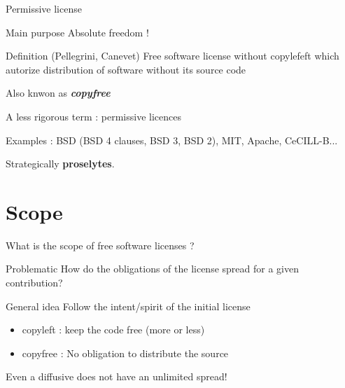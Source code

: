 \documentclass{beamer}
\begin{document}
\begin{frame}{Permissive license}

  \begin{block}{Main purpose}
    Absolute freedom !
  \end{block}

  \begin{alertblock}{Definition (Pellegrini, Canevet)}
    Free software license without copylefeft which autorize distribution of software without its source code
   \end{alertblock}

Also knwon as \textit{\textbf{copyfree}}

A less rigorous term : permissive licences 

Examples : BSD (BSD 4 clauses, BSD 3, BSD 2), MIT, Apache, CeCILL-B... 

Strategically \textbf{proselytes}.

\end{frame}


\section{Scope}

\begin{frame}{What is the scope of free software licenses ?}

  \begin{alertblock}{Problematic}
    How do the obligations of the license spread for a given contribution?
  \end{alertblock}

  \begin{block}{General idea}
    Follow the intent/spirit of the initial license    
  \end{block}

  \begin{itemize}
  \item copyleft : keep the code free (more or less)
  \item copyfree : No obligation to distribute the source
  \end{itemize}

Even a diffusive does not have an unlimited spread!
  
\end{frame}
\end{document}
